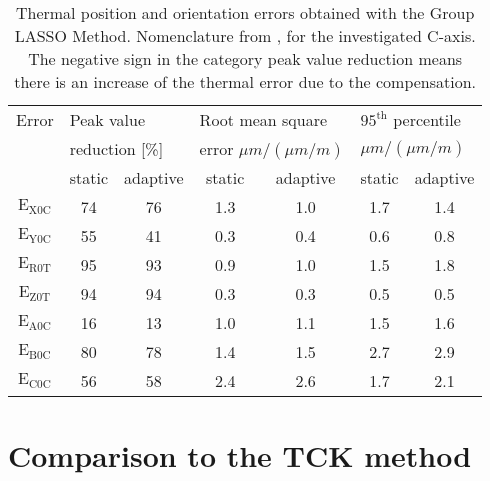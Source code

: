 \begin{table}[!htb]
\centering
\begin{threeparttable}
\caption[Statistical evaluation of the data and comparison of the methods - static vs. adaptive]{Thermal position and orientation errors obtained with the Group LASSO Method.  Nomenclature from \cite{Blaser_2017}, for the investigated C-axis. The negative sign in the category peak value reduction means there is an increase of the thermal error due to the compensation.}
\begin{tabular}{c c c c c c c}
\hline
Error  & \multicolumn{2}{l}{Peak value} \hspace{2cm} & \multicolumn{2}{l}{Root mean square} \hspace{2cm} & \multicolumn{2}{l}{$\mathrm{95^{th}}$ percentile} \vspace{-0.2cm} \\
 & \multicolumn{2}{l}{reduction [\%]} & \multicolumn{2}{l}{error $\mu m / (\mu m / m)$} & \multicolumn{2}{l}{$\mu m / (\mu m / m)$} \\
\hline
  & static & adaptive & static & adaptive & static & adaptive \\
  \hline \vspace{-0.2cm}
 $\mathrm{E_{X0C}}$ & 74 & 76 & 1.3 & 1.0 & 1.7 & 1.4 \\ \vspace{-0.2cm}
 $\mathrm{E_{Y0C}}$ & 55 & 41 & 0.3 & 0.4 & 0.6 & 0.8 \\ \vspace{-0.2cm}
 $\mathrm{E_{R0T}}$ & 95 & 93 & 0.9 & 1.0 & 1.5 & 1.8 \\ \vspace{-0.2cm}
 $\mathrm{E_{Z0T}}$ & 94 & 94 & 0.3 & 0.3 & 0.5 &  0.5\\ \vspace{-0.2cm}
 $\mathrm{E_{A0C}}$ & 16 & 13 & 1.0 & 1.1 & 1.5 & 1.6 \\ \vspace{-0.2cm}
 $\mathrm{E_{B0C}}$ & 80 & 78 & 1.4 & 1.5 & 2.7 & 2.9 \\ 
 $\mathrm{E_{C0C}}$ & 56 & 58 & 2.4 & 2.6 & 1.7 & 2.1 \\
\hline
\end{tabular}
\label{Tab:statistic_GL}
\end{threeparttable}
\end{table}


\section{Comparison to the TCK method}
\label{sec:comparisonTCK}

\